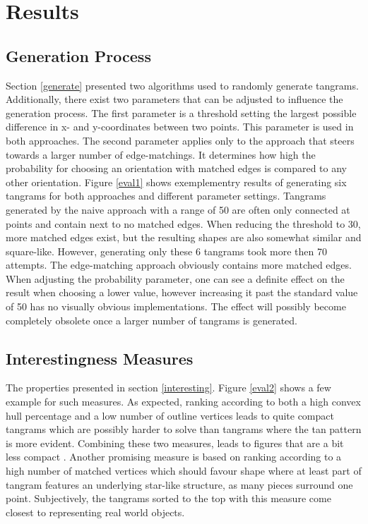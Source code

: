 \chapter{Results}\label{chapter:results}

\section{Generation Process}

Section \ref{generate} presented two algorithms used to randomly generate tangrams. Additionally, there exist two parameters that can be adjusted to influence the generation process. The first parameter is a threshold setting the largest possible difference in x- and y-coordinates between two points. This parameter is used in both approaches. The second parameter applies only to the approach that steers towards a larger number of edge-matchings. It determines how high the probability for choosing an orientation with matched edges is compared to any other orientation. Figure \ref{eval1} shows exemplementry results of generating six tangrams for both approaches and different parameter settings. Tangrams generated by the naive approach with a range of 50 are often only connected at points and contain next to no matched edges. When reducing the threshold to 30, more matched edges exist, but the resulting shapes are also somewhat similar and square-like. However, generating only these 6 tangrams took more then 70 attempts. The edge-matching approach obviously contains more matched edges. When adjusting the probability parameter, one can see a definite effect on the result when choosing a lower value, however increasing it past the standard value of 50 has no visually obvious implementations. The effect will possibly become completely obsolete once a larger number of tangrams is generated. 



\section{Interestingness Measures}

The properties presented in section \ref{interesting}. Figure \ref{eval2} shows a few example for such measures. As expected, ranking according to both a high convex hull percentage and a low number of outline vertices leads to quite compact tangrams which are possibly harder to solve than tangrams where the tan pattern is more evident. Combining these two measures, leads to figures that are a bit less compact . Another promising measure is based on ranking according to a high number of matched vertices which should favour shape where at least part of tangram features an underlying star-like structure, as many pieces surround one point. Subjectively, the tangrams sorted to the top with this measure come closest to representing real world objects. 

